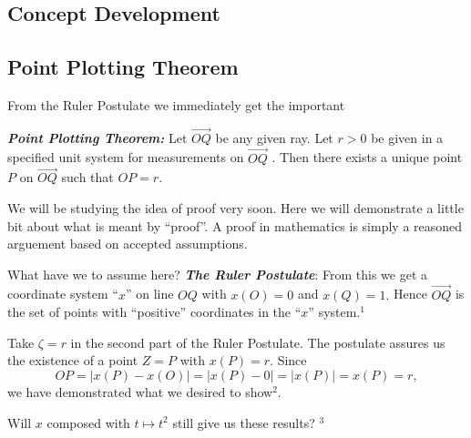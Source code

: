 \documentclass{tufte-handout}
\newcommand{\uv}{\vspace{.1in}}
\begin{document}
\begin{tcolorbox}[enhanced jigsaw,breakable,pad at break*=1mm,
  colback=cyan!2!white,colframe=blue!75!black,title=Student View: Slide 9,drop fuzzy shadow,watermark color=white,watermark text=\arabic{tcbbreakpart}]
  \section{Concept Development}\subsection{Point Plotting Theorem}
  From the Ruler Postulate we immediately get the important
  \begin{tcolorbox}[colback=blue!4]
  \textbf{\textit{Point Plotting Theorem:}}
  Let $\overrightarrow{OQ}$ be any given ray. Let $\displaystyle{r>0}$ be given in a specified unit system for measurements on $\overrightarrow{OQ}$ . Then there exists a  unique point $P$ on $\overrightarrow{OQ}$ such that $\displaystyle{OP=r.}$
  
  \end{tcolorbox}
  
  We will be studying the idea of proof very soon. Here we will demonstrate a little bit about what is meant by ``proof''. A proof in mathematics is simply a reasoned arguement based on accepted assumptions. 
  
  \uv What have we to assume here? \textbf{\textit{The Ruler Postulate}}: From this we get a coordinate system ``$x$'' on line $OQ$ with $\displaystyle{x(O)=0}$ and $\displaystyle{x(Q)=1.}$ Hence $\overrightarrow{OQ}$ is the set of points with ``positive'' coordinates in the ``$x$'' system.$^1$
  
  \uv Take $\displaystyle{\zeta = r}$ in the second part of the Ruler Postulate. The postulate assures us the existence of a point $\displaystyle{Z=P}$ with $\displaystyle{x(P)=r}$. Since
  \[OP=|x(P)-x(O)|=|x(P)- 0|=|x(P)|=x(P)=r,
  \]
  we have demonstrated what we desired to show$^2$.
  
  \uv {} Will $x$ composed with  $t\mapsto t^2 $ still give us these results? $^3$ 
  
 
\end{tcolorbox}
\end{document}
